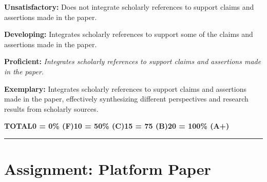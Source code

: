 \documentclass[
]{book}
\begin{document}
\textbf{Unsatisfactory:} Does not integrate scholarly references to support claims and assertions made in
the paper.

\textbf{Developing:} Integrates scholarly references to support some of the claims and assertions
made in the paper.

\textbf{Proficient:} \emph{Integrates scholarly references to support claims and assertions made in the
paper.}

\textbf{Exemplary:} Integrates scholarly references to support claims and assertions made in the
paper, effectively synthesizing different perspectives and research results from
scholarly sources.

\textbar{}\textbf{TOTAL}\textbar{}\textbf{0 = 0\% (F)}\textbar{}\textbf{10 = 50\% (C)}\textbar{}\textbf{15 = 75 (B)}\textbar{}\textbf{20 = 100\% (A+)}\textbar{}

\begin{center}\rule{0.5\linewidth}{0.5pt}\end{center}

\hypertarget{assignment-platform-paper}{%
\section{Assignment: Platform Paper}\label{assignment-platform-paper}}
\end{document}
